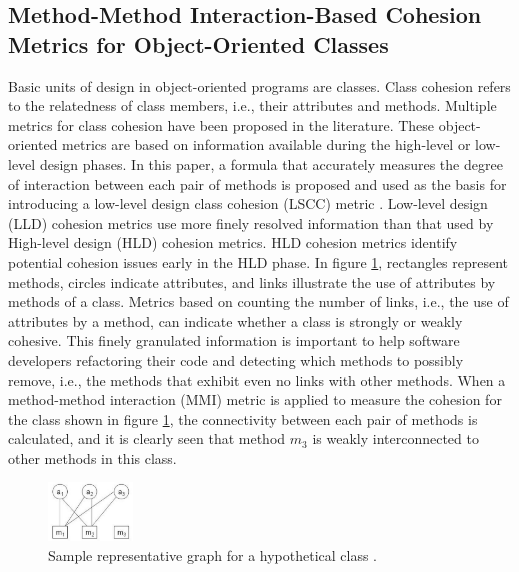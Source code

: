 \subsection{Method-Method Interaction-Based Cohesion Metrics for Object-Oriented Classes}

Basic units of design in object-oriented programs are classes. Class cohesion refers to the relatedness of class members, i.e., their attributes and methods. Multiple metrics for class cohesion have been proposed in the literature. These object-oriented metrics are based on information available during the high-level or low-level design phases.
In this paper, a formula that accurately measures the degree of interaction between each pair of methods is proposed and used as the basis for introducing a low-level design class cohesion (LSCC) metric \cite{b8al2012precise}. Low-level design (LLD) cohesion metrics use more finely resolved information than that used by High-level design (HLD) cohesion metrics. HLD cohesion metrics identify potential cohesion issues early in the HLD phase. 
In figure \ref{fig1}, rectangles represent methods, circles indicate attributes, and links illustrate the use of attributes by methods of a class. Metrics based on counting the number of links, i.e., the use of attributes by a method, can indicate whether a class is strongly or weakly cohesive. This finely granulated
information is important to help software developers refactoring their code and detecting which methods to possibly remove, i.e., the methods that exhibit even no
links with other methods. When a method-method interaction (MMI) metric
is applied to measure the cohesion for the class shown in figure \ref{fig1}, the
connectivity between each pair of methods is calculated, and it is clearly seen that
method $m_3$ is weakly interconnected to other methods in this class.

\begin{figure}[htbp]
	\centerline{\includegraphics[width=0.2\textwidth]{pictures/am.png}}
	\caption{Sample representative graph for a hypothetical class \cite{b3al2012fault}.}
	\label{fig1}
\end{figure}

